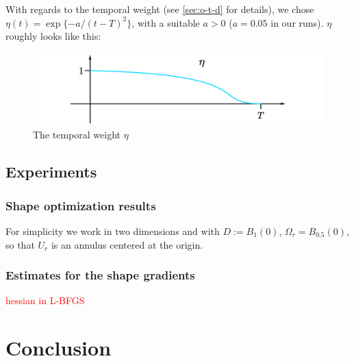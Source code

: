 \documentclass[english,a4paper,9pt,oneside]{scrbook}	%
\theoremstyle{break}
\theoremstyle{remark}
\newcommand{\tred}[1]{\textcolor{red}{#1}}
\begin{document}
With regards to the temporal weight (see \cref{sec:o-t-d} for details), we chose $\eta(t) = \exp\{-a/(t-T)^2\}$, with a suitable $a>0$ ($a=0.05$ in our runs). $\eta$ roughly looks like this:

\begin{figure}[H]
\centering
\includegraphics[width=0.5\columnwidth]{Images/Eta.pdf}
\caption{The temporal weight $\eta$}\label{fig:eta}
\end{figure}

\section{Experiments}
\label{sec:experiments}

\subsection{Shape optimization results}

For simplicity we work in two dimensions and with $D:=B_1(0)$, $\Omega_r = B_{0.5}(0)$, so that $U_r$ is an annulus centered at the origin.

\subsection{Estimates for the shape gradients}

\tred{hessian in L-BFGS}

\chapter{Conclusion}
\end{document}
